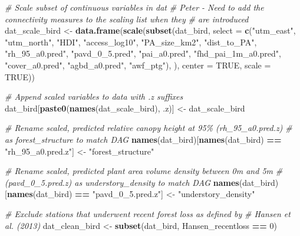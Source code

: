 \documentclass[
]{article}
\newenvironment{Shaded}{\begin{snugshade}}{\end{snugshade}}
\newcommand{\AttributeTok}[1]{\textcolor[rgb]{0.13,0.29,0.53}{#1}}
\newcommand{\CommentTok}[1]{\textcolor[rgb]{0.56,0.35,0.01}{\textit{#1}}}
\newcommand{\ConstantTok}[1]{\textcolor[rgb]{0.56,0.35,0.01}{#1}}
\newcommand{\DecValTok}[1]{\textcolor[rgb]{0.00,0.00,0.81}{#1}}
\newcommand{\FunctionTok}[1]{\textcolor[rgb]{0.13,0.29,0.53}{\textbf{#1}}}
\newcommand{\NormalTok}[1]{#1}
\newcommand{\OtherTok}[1]{\textcolor[rgb]{0.56,0.35,0.01}{#1}}
\newcommand{\SpecialCharTok}[1]{\textcolor[rgb]{0.81,0.36,0.00}{\textbf{#1}}}
\newcommand{\StringTok}[1]{\textcolor[rgb]{0.31,0.60,0.02}{#1}}
\begin{document}
\begin{Shaded}
\begin{Highlighting}[]
\CommentTok{\# Scale subset of continuous variables in dat}
\CommentTok{\# Peter {-} Need to add the connectivity measures to the scaling list when they }
\CommentTok{\# are introduced}
\NormalTok{dat\_scale\_bird }\OtherTok{\textless{}{-}} \FunctionTok{data.frame}\NormalTok{(}\FunctionTok{scale}\NormalTok{(}\FunctionTok{subset}\NormalTok{(dat\_bird, }\AttributeTok{select =} \FunctionTok{c}\NormalTok{(}\StringTok{"utm\_east"}\NormalTok{, }\StringTok{"utm\_north"}\NormalTok{, }
                                                     \StringTok{"HDI"}\NormalTok{, }\StringTok{"access\_log10"}\NormalTok{, }
                                                     \StringTok{"PA\_size\_km2"}\NormalTok{, }
                                                     \StringTok{"dist\_to\_PA"}\NormalTok{, }
                                                     \StringTok{"rh\_95\_a0.pred"}\NormalTok{, }
                                                     \StringTok{"pavd\_0\_5.pred"}\NormalTok{, }
                                                     \StringTok{"pai\_a0.pred"}\NormalTok{, }
                                                     \StringTok{"fhd\_pai\_1m\_a0.pred"}\NormalTok{, }
                                                     \StringTok{"cover\_a0.pred"}\NormalTok{, }
                                                     \StringTok{"agbd\_a0.pred"}\NormalTok{,}
                                                     \StringTok{"awf\_ptg"}\NormalTok{), }
\NormalTok{                                     ), }
                              \AttributeTok{center =} \ConstantTok{TRUE}\NormalTok{, }\AttributeTok{scale =} \ConstantTok{TRUE}\NormalTok{))}

\CommentTok{\# Append scaled variables to data with .z suffixes}
\NormalTok{dat\_bird[}\FunctionTok{paste0}\NormalTok{(}\FunctionTok{names}\NormalTok{(dat\_scale\_bird), }\StringTok{\textquotesingle{}.z\textquotesingle{}}\NormalTok{)] }\OtherTok{\textless{}{-}}\NormalTok{ dat\_scale\_bird}

\CommentTok{\# Rename scaled, predicted relative canopy height at 95\% (rh\_95\_a0.pred.z) }
\CommentTok{\# as forest\_structure to match DAG }
\FunctionTok{names}\NormalTok{(dat\_bird)[}\FunctionTok{names}\NormalTok{(dat\_bird) }\SpecialCharTok{==} \StringTok{"rh\_95\_a0.pred.z"}\NormalTok{] }\OtherTok{\textless{}{-}} \StringTok{"forest\_structure"}

\CommentTok{\# Rename scaled, predicted plant area volume density between 0m and 5m }
\CommentTok{\# (pavd\_0\_5.pred.z) as understory\_density to match DAG}
\FunctionTok{names}\NormalTok{(dat\_bird)[}\FunctionTok{names}\NormalTok{(dat\_bird) }\SpecialCharTok{==} \StringTok{"pavd\_0\_5.pred.z"}\NormalTok{] }\OtherTok{\textless{}{-}} \StringTok{"understory\_density"}

\CommentTok{\# Exclude stations that underwent recent forest loss as defined by }
\CommentTok{\# Hansen et al. (2013)}
\NormalTok{dat\_clean\_bird }\OtherTok{\textless{}{-}} \FunctionTok{subset}\NormalTok{(dat\_bird, Hansen\_recentloss }\SpecialCharTok{==} \DecValTok{0}\NormalTok{)}
\end{Highlighting}
\end{Shaded}
\end{document}
